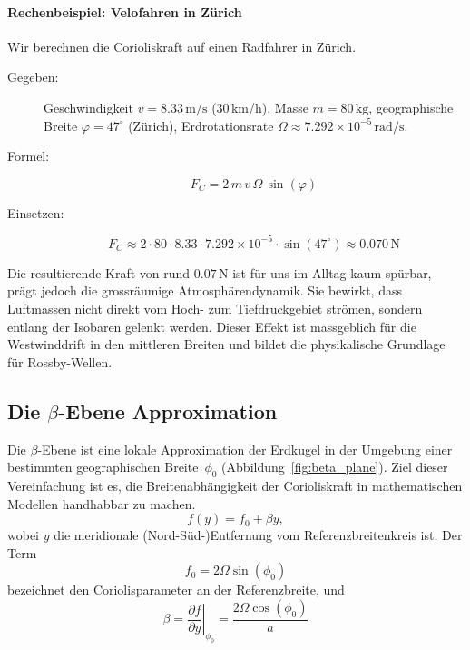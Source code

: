 \paragraph{Rechenbeispiel: Velofahren in Zürich}

Wir berechnen die Corioliskraft auf einen Radfahrer in Zürich.

\begin{description}
	\item[Gegeben:] Geschwindigkeit \(v = 8.33\,\mathrm{m/s}\) (30\,km/h), Masse \(m =
	      80\,\mathrm{kg}\), geographische Breite \(\varphi = 47^\circ\) (Zürich),
	      Erdrotationsrate \(\Omega \approx 7.292 \times 10^{-5}\,\mathrm{rad/s}\).
	\item[Formel:]
	      \[
		      F_C = 2\,m\,v\,\Omega\,\sin(\varphi)
	      \]
	\item[Einsetzen:]
	      \[
		      F_C \approx 2 \cdot 80 \cdot 8.33 \cdot 7.292 \times 10^{-5} \cdot \sin(47^\circ)
		      \approx 0.070\,\mathrm{N}
	      \]
\end{description}

\noindent
Die resultierende Kraft von rund \(0.07\,\mathrm{N}\) ist für uns im Alltag kaum spürbar, prägt jedoch die grossräumige Atmosphärendynamik.
Sie bewirkt, dass Luftmassen nicht direkt vom Hoch- zum Tiefdruckgebiet strömen, sondern entlang der Isobaren gelenkt werden.
Dieser Effekt ist massgeblich für die Westwinddrift in den mittleren Breiten und bildet die physikalische Grundlage für Rossby-Wellen.

\subsection{Die \texorpdfstring{$\beta$}{β}-Ebene Approximation}

Die $\beta$-Ebene ist eine lokale Approximation der Erdkugel in der Umgebung
einer bestimmten geographischen Breite~$\phi_0$
(Abbildung~\ref{fig:beta_plane}). Ziel dieser Vereinfachung ist es, die
Breitenabhängigkeit der Corioliskraft in mathematischen Modellen handhabbar zu
machen.
\begin{equation}
	f(y) = f_0 + \beta y,
	\label{rossby:eq:beta_plane}
\end{equation}
wobei $y$ die meridionale (Nord-Süd-)Entfernung vom Referenzbreitenkreis ist. Der Term
\begin{equation}
	f_0 = 2\Omega \sin(\phi_0)
	\label{rossby:eq:coriolis_parameter_ref}
\end{equation}
bezeichnet den Coriolisparameter an der Referenzbreite, und
\begin{equation}
	\beta = \left.\frac{\partial f}{\partial y}\right|_{\phi_0} = \frac{2\Omega \cos(\phi_0)}{a}
	\label{rossby:eq:beta_parameter_ref}
\end{equation}

